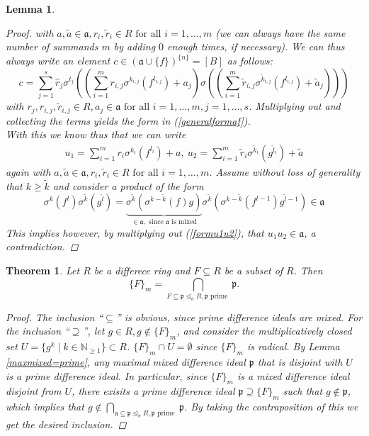 \documentclass{article}
\def\NE{\mathbb{N}_{\geq1}}
\def\a{\mathfrak{a}}
\def\p{\mathfrak{p}}
\def\s{\sigma}
\def\si{\unlhd_{\sigma}}
\def\fa{\text{ for all }}
\newenvironment{bew}{\begin{proof}[Proof]}{\end{proof}}
\theoremstyle{plain}
\newtheorem{theorem}[Satz]{Theorem}
\newtheorem{lem}[Satz]{Lemma}
\theoremstyle{definition}
\begin{document}
\begin{lem}
\begin{bew}
with $a, \tilde a \in \a, r_i, \tilde r_i \in R \fa i = 1,\ldots,m$ (we can always have the same number of summands $m$ by adding $0$ enough times, if necessary).
 We can thus always write an element $c \in  (\a \cup \{f\})^{\{n\}} = [B]$ as follows:
\[ c = \sum_{j=1}^s \hat r_j \s^{t_j} \left( (\sum_{i=1}^{m} r_{i,j} \s^{k_{i,j}}(f^{l_{i,j}}) + a_j)\s((\sum_{i=1}^{m} \tilde r_{i,j} \s^{\tilde k_{i,j}}(f^{l_{i,j}}) + \tilde a_j)) \right) \]
with $r_j, r_{i,j}, \tilde r_{i,j} \in R, a_j \in \a \fa i = 1,\ldots, m, j = 1, \ldots, s$. Multiplying out and collecting the terms yields the form in (\ref{generalformaf}). \\
\indent With this we know thus that we can write 
\begin{align}\label{formu1u2} u_1 = \sum_{i=1}^m r_i \s^{k_i}(f^{l_i}) + a, ~ u_2 = \sum_{i=1}^m \tilde r_i \s^{\tilde k_i}(g^{\tilde l_i}) + \tilde a \end{align}
again with $a, \tilde a \in \a, r_i, \tilde r_i \in R \fa i = 1,\ldots,m$. 
Assume without loss of generality that $k \geq \tilde k$ and consider a product of the form 
\[ \s^{k}(f^{l}) \s^{\tilde k}(g^{\tilde l}) = \underbrace{\s^{\tilde k}(\s^{k - \tilde k}(f) g)}_{\in \a, \text{ since } \a \text{ is mixed}} \s^{\tilde k}(\s^{k - \tilde k}(f^{l-1}) g^{\tilde l - 1}) \in \a \]
This implies however, by multiplying out (\ref{formu1u2}), that $u_1 u_2 \in \a$, a contradiction.
\end{bew}
\end{lem}

\begin{theorem}
Let $R$ be a differece ring and $F \subseteq R$ be a subset of $R$. Then
\[ \{ F \}_m = \bigcap_{F \subseteq \p \si R, \p \text{ prime }} \p.\]
\begin{proof}
The inclusion ``$\subseteq$'' is obvious, since prime difference ideals are mixed. For the inclusion ``$\supseteq$'', let $g \in R, g \notin \{ F \}_m$, and consider the multiplicatively closed set $U = \{ g^k \mid k \in \NE \} \subset R$. 
$\{ F \}_m \cap U = \emptyset$ since $\{ F \}_m$ is radical. By Lemma \ref{maxmixed=prime}, any maximal mixed difference ideal $\p$ that is disjoint with $U$ is a prime difference ideal. In particular, since $\{F\}_m$ is a mixed difference ideal disjoint from $U$, there exisits a prime difference ideal $\p \supseteq \{F\}_m$ such that $g \notin \p$,
which implies that $g \notin \bigcap_{\a \subseteq \p \si R, \p \text{ prime }} \p$. By taking the contraposition of this we get the desired inclusion.
\end{proof}
\end{theorem}
\end{document}
